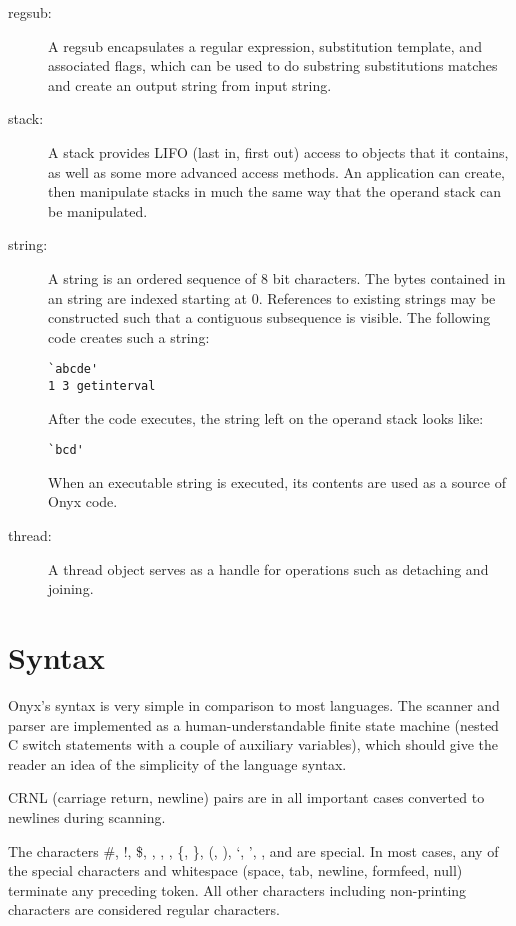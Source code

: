 \begin{description}
\item[regsub: ] A regsub encapsulates a regular expression, substitution
template, and associated flags, which can be used to do substring substitutions
matches and create an output string from input string.

\item[stack: ] A stack provides LIFO (last in, first out) access to objects that
it contains, as well as some more advanced access methods.  An application can
create, then manipulate stacks in much the same way that the operand stack can
be manipulated.

\item[string: ] A string is an ordered sequence of 8 bit characters.  The bytes
contained in an string are indexed starting at 0.  References to existing
strings may be constructed such that a contiguous subsequence is visible.  The
following code creates such a string:

\begin{verbatim}
`abcde'
1 3 getinterval
\end{verbatim}

After the code executes, the string left on the operand stack looks like:

\begin{verbatim}
`bcd'
\end{verbatim}

When an executable string is executed, its contents are used as a source of Onyx
code.

\item[thread: ] A thread object serves as a handle for operations such as
detaching and joining.

\end{description}

\section{Syntax}
\label{sec:onyx_syntax}
Onyx's syntax is very simple in comparison to most languages.  The scanner and
parser are implemented as a human-understandable finite state machine (nested C
switch statements with a couple of auxiliary variables), which should give the
reader an idea of the simplicity of the language syntax.

CRNL (carriage return, newline) pairs are in all important cases converted to
newlines during scanning.

The characters \#, !, \$, {\twid}, {\lb}, {\rb}, \{, \}, (, ), `, ', {\lt}, and
{\gt} are special.  In most cases, any of the special characters and whitespace
(space, tab, newline, formfeed, null) terminate any preceding token.  All other
characters including non-printing characters are considered regular characters.

